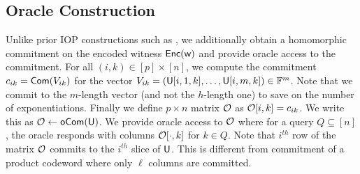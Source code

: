 
\subsection{Oracle Construction}\label{sec:construct_oracle} 
Unlike prior IOP constructions such as \cite{ligero, aurora}, we additionally
obtain a homomorphic commitment on the encoded witness $\mathsf{Enc}(\mathsf{w})$ and provide
oracle access to the commitment. 
For all $(i,k)\in [p]\times
[n]$, we  compute the commitment %
$c_{ik}=\mathsf{Com}(V_{ik})$ for the vector 
$V_{ik}=(\mathsf{U}[i,1,k],\ldots,\mathsf{U}[i,m,k])\in \mathbb{F}^m$. Note that we commit to the $m$-length vector (and not the $h$-length one)  to save on the number of exponentiations. 
Finally we define $p\times n$ matrix $\mathcal{O}$ as
$\mathcal{O}[i,k]=c_{ik}$. We write this as $\mathcal{O} \gets \mathsf{oCom}(\mathsf{U})$. We provide oracle access to $\mathcal{O}$ where for a
query $Q\subseteq [n]$, the oracle responds with columns $\mathcal{O}[\cdot,k]$ for
$k\in Q$. Note that $i^{th}$ row of the matrix $\mathcal{O}$ commits to the
$i^{th}$ slice of $\mathsf{U}$.   This is different from  commitment of a product codeword 
where only 
$\ell$ columns are committed. %
\begin{comment}
\subsection{Well-formed Encodings}\label{sec:wellformedenc}
Let $\mc{W}$ denote the subset of $\mc{M}_{p,h,n}$
consisting of matrices $U$ such that $U[i,\cdot,\cdot]\in L_1\otimes L_2$ for all $i\in [p]$. 
We call an encoding $\ewit$ to be {\em well-formed} if $\ewit\in \mc{W}$. Note
that an encoding $\ewit\gets \enc(\wit)$ for any $\wit\in \FF^N$ is well formed. 
Let $\mc{W}_1$ denote the set of matrices
$U$ in $\mc{M}_{p,h,n}$ such that the $n$-length vector $U[i,j,\cdot]$ is a
codeword in $L_1$ for all $i,j$. Similarly let $\mc{W}_2$ denote the set of
matrices $U$ such that the $h$-length vector $U[i,\cdot,k]$ is a codeword in
$L_2$ for all $i,k$. It can be seen that $\mc{W}=\mc{W}_1\cap \mc{W}_2$. For $U^\ast\in \mc{M}_{p,h,n}$ define
$d(U^\ast,\mc{W}_i)=\min\{\Delta_i(U^\ast,U):U\in \mc{W}_i\}$ for $i=1,2$.
\end{comment}
